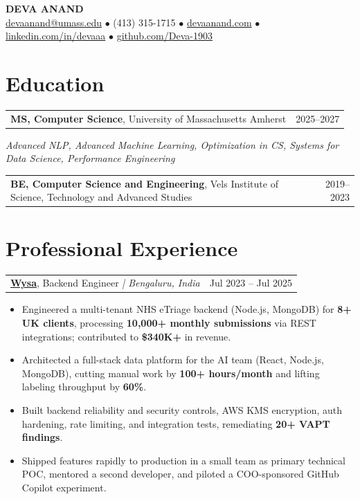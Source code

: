 \documentclass[letterpaper,11pt]{article}
\makeatletter
\newcommand{\eduItem}[3]{%
  \begin{tabular*}{\textwidth}{@{}l@{\extracolsep{\fill}}r@{}}
    \textbf{#1}, #2 & #3 \\
  \end{tabular*}\par
}
\newcommand{\expItem}[4]{%
  \vspace{3pt}
  \begin{tabular*}{\textwidth}{@{}l@{\extracolsep{\fill}}r@{}}
    \textbf{#1}, #2 \textit{| #3} & #4 \\
  \end{tabular*}\par\vspace{-2pt}
}
\makeatother
\begin{document}
\begin{center}
    {\fontsize{18}{20}\selectfont\bfseries DEVA ANAND}\\ \vspace{3pt}
    {\small
    \href{mailto:devaanand@umass.edu}{devaanand@umass.edu}
    \enspace$\bullet$\enspace
    (413) 315-1715
    \enspace$\bullet$\enspace
    \href{https://devaanand.com}{devaanand.com}
    \enspace$\bullet$\enspace
    \href{https://linkedin.com/in/devaaa/}{linkedin.com/in/devaaa}
    \enspace$\bullet$\enspace
    \href{https://github.com/Deva-1903}{github.com/Deva-1903}}
\end{center}
\vspace{-6pt}

\section{Education}
\eduItem{MS, Computer Science}{University of Massachusetts Amherst}{2025--2027}
{\small\textit{Advanced NLP, Advanced Machine Learning, Optimization in CS, Systems for Data Science, Performance Engineering}}\par
\vspace{3pt}
\eduItem{BE, Computer Science and Engineering}{Vels Institute of Science, Technology and Advanced Studies}{2019--2023}

\section{Professional Experience}

\expItem{\href{https://www.wysa.io}{Wysa}}{Backend Engineer}{Bengaluru, India}{Jul 2023 -- Jul 2025}
\begin{itemize}
  \item Engineered a multi-tenant NHS eTriage backend (Node.js, MongoDB) for \textbf{8+ UK clients}, processing \textbf{10{,}000+ monthly submissions} via REST integrations; contributed to \textbf{\$340K+} in revenue.
  \item Architected a full-stack data platform for the AI team (React, Node.js, MongoDB), cutting manual work by \textbf{100+ hours/month} and lifting labeling throughput by \textbf{60\%}.
  \item Built backend reliability and security controls, AWS KMS encryption, auth hardening, rate limiting, and integration tests, remediating \textbf{20+ VAPT findings}.
  \item Shipped features rapidly to production in a small team as primary technical POC, mentored a second developer, and piloted a COO-sponsored GitHub Copilot experiment.
\end{itemize}
\end{document}
